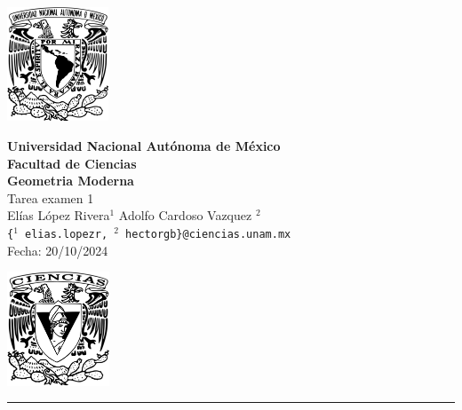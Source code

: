 \documentclass[11pt,letterpaper]{article}
\begin{document}

\begin{center}
    \begin{minipage}{3cm}
    	\begin{center}
    		\includegraphics[height=3.4cm]{logo_unam.png}
    	\end{center}
    \end{minipage}\hfill
    \begin{minipage}{10cm}
    	\begin{center}
    	\textbf{\large Universidad Nacional Autónoma de México}\\[0.1cm]
        \textbf{Facultad de Ciencias}\\[0.1cm]
        \textbf{Geometria Moderna}\\[0.1cm]
        Tarea examen 1 \\[0.1cm]
         El\'ias L\'opez Rivera$^{1}$\,\,Adolfo Cardoso Vazquez $^{2}$\\[0.1cm]
    
        \texttt{\{$^{1}$ elias.lopezr,\,${^2}$\,hectorgb\}@ciencias.unam.mx }\\[0.1cm]
        Fecha:\,\,20/10/2024
    	\end{center}
    \end{minipage}\hfill
    \begin{minipage}{3cm}
    	\begin{center}
    		\includegraphics[height=3.4cm]{Logo_FC.png}
    	\end{center}
    \end{minipage}
\end{center}

\rule{17cm}{0.1mm}
\end{document}
